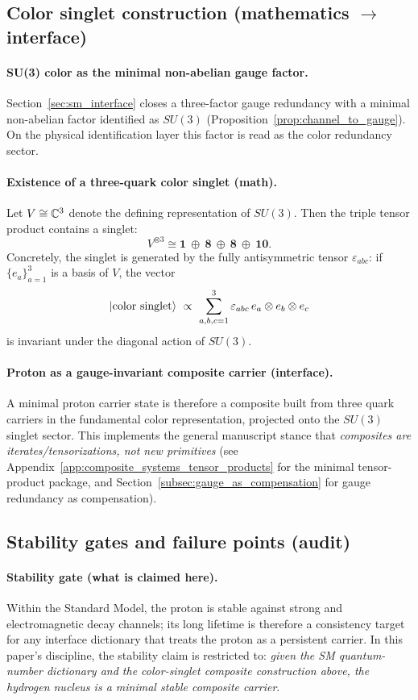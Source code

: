 \subsection{Color singlet construction (mathematics \texorpdfstring{$\to$}{->} interface)}
\paragraph{SU(3) color as the minimal non-abelian gauge factor.}
Section~\ref{sec:sm_interface} closes a three-factor gauge redundancy with a minimal non-abelian factor identified as $SU(3)$ (Proposition~\ref{prop:channel_to_gauge}).
On the physical identification layer this factor is read as the color redundancy sector.

\paragraph{Existence of a three-quark color singlet (math).}
\MathTag Let $V\cong \mathbb{C}^3$ denote the defining representation of $SU(3)$.
Then the triple tensor product contains a singlet:
\[
V^{\otimes 3}\cong \mathbf{1}\ \oplus\ \mathbf{8}\ \oplus\ \mathbf{8}\ \oplus\ \mathbf{10}.
\]
Concretely, the singlet is generated by the fully antisymmetric tensor $\varepsilon_{abc}$: if $\{e_a\}_{a=1}^3$ is a basis of $V$, the vector
\[
\ket{\mathrm{color\ singlet}}
\ \propto\
\sum_{a,b,c=1}^3 \varepsilon_{abc}\, e_a\otimes e_b\otimes e_c
\]
is invariant under the diagonal action of $SU(3)$.

\paragraph{Proton as a gauge-invariant composite carrier (interface).}
\InterfaceTag A minimal proton carrier state is therefore a composite built from three quark carriers in the fundamental color representation, projected onto the $SU(3)$ singlet sector.
This implements the general manuscript stance that \emph{composites are iterates/tensorizations, not new primitives} (see Appendix~\ref{app:composite_systems_tensor_products} for the minimal tensor-product package, and Section~\ref{subsec:gauge_as_compensation} for gauge redundancy as compensation).

\subsection{Stability gates and failure points (audit)}
\paragraph{Stability gate (what is claimed here).}
\AuditTag Within the Standard Model, the proton is stable against strong and electromagnetic decay channels; its long lifetime is therefore a consistency target for any interface dictionary that treats the proton as a persistent carrier.
In this paper's discipline, the stability claim is restricted to: \emph{given the SM quantum-number dictionary and the color-singlet composite construction above, the hydrogen nucleus is a minimal stable composite carrier}.

